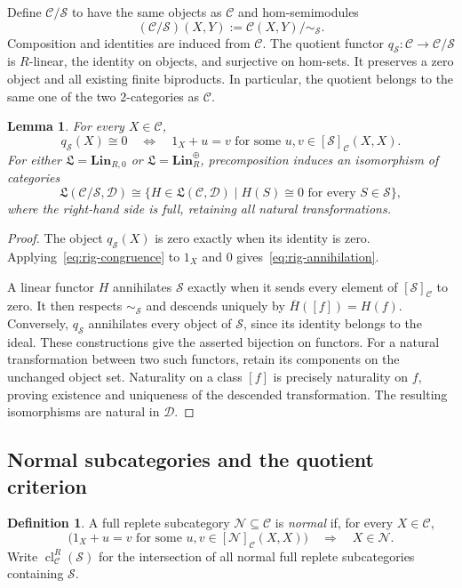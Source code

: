 \documentclass[11pt,reqno,a4paper]{amsart}
\newtheorem{lemma}[theorem]{Lemma}
\theoremstyle{definition}
\newtheorem{definition}[theorem]{Definition}
\theoremstyle{remark}
\newcommand{\C}{\mathcal{C}}
\newcommand{\D}{\mathcal{D}}
\newcommand{\N}{\mathcal{N}}
\newcommand{\0}{\mathbf{0}}
\renewcommand{\1}{\mathbf{1}}
\newcommand{\iso}{\cong}
\newcommand{\Lcat}{\mathfrak L}
\newcommand{\Scl}{\mathcal S}
\DeclareMathOperator{\cl}{cl}
\begin{document}
Define $\C/\Scl$ to have the same objects as $\C$ and
hom-semimodules
\[
 (\C/\Scl)(X,Y):=\C(X,Y)/{\sim_{\Scl}}.
\]
Composition and identities are induced from $\C$. The quotient
functor $q_{\Scl}:\C\to\C/\Scl$ is $R$-linear, the identity
on objects, and surjective on hom-sets. It preserves a zero
object and all existing finite biproducts. In particular, the
quotient belongs to the same one of the two $2$-categories as
$\C$.

\begin{lemma}\label{lem:rig-quotient}
For every $X\in\C$,
\begin{equation}\label{eq:rig-annihilation}
 q_{\Scl}(X)\iso0
 \quad\Longleftrightarrow\quad
 1_X+u=v
 \text{ for some }u,v\in[\Scl]_{\C}(X,X).
\end{equation}
For either $\Lcat=\mathbf{Lin}_{R,0}$ or
$\Lcat=\mathbf{Lin}_{R}^{\oplus}$, precomposition induces an
isomorphism of categories
\begin{equation}\label{eq:rig-quotient-up}
 \Lcat(\C/\Scl,\D)\iso
 \{H\in\Lcat(\C,\D)\mid H(S)\iso0
                         \text{ for every }S\in\Scl\},
\end{equation}
where the right-hand side is full, retaining all natural
transformations.
\end{lemma}
\begin{proof}
The object $q_{\Scl}(X)$ is zero exactly when its identity is
zero. Applying~\eqref{eq:rig-congruence} to $1_X$ and $0$
gives~\eqref{eq:rig-annihilation}.

A linear functor $H$ annihilates $\Scl$ exactly when it sends
every element of $[\Scl]_{\C}$ to zero. It then respects
$\sim_{\Scl}$ and descends uniquely by
$\overline H([f])=H(f)$. Conversely, $q_{\Scl}$ annihilates
every object of $\Scl$, since its identity belongs to the ideal.
These constructions give the asserted bijection on functors.
For a natural transformation between two such functors, retain
its components on the unchanged object set. Naturality on a
class $[f]$ is precisely naturality on $f$, proving existence
and uniqueness of the descended transformation. The resulting
isomorphisms are natural in $\D$.
\end{proof}

\subsection{Normal subcategories and the quotient criterion}

\begin{definition}\label{def:rig-normal}
A full replete subcategory $\N\subseteq\C$ is \emph{normal}
if, for every $X\in\C$,
\begin{equation}\label{eq:rig-normal}
 \bigl(1_X+u=v\text{ for some }
       u,v\in[\N]_{\C}(X,X)\bigr)
 \quad\Longrightarrow\quad X\in\N.
\end{equation}
Write $\cl^{R}_{\C}(\Scl)$ for the intersection of all normal
full replete subcategories containing $\Scl$.
\end{definition}
\end{document}
